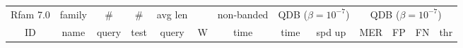 %
%
%
%

\renewcommand{\baselinestretch}{1.0}
\begin{table}
\scriptsize
\begin{center}
\begin{tabular}{|ll|rr|rr|r|rr|rrrr|} \hline
\multicolumn{1}{|c}{Rfam 7.0} & \multicolumn{1}{c|}{family} &
\multicolumn{1}{c}{\#} & \multicolumn{1}{c|}{\#} &
\multicolumn{1}{c}{avg len} & \multicolumn{1}{c|}{} &
\multicolumn{1}{c}{non-banded} & \multicolumn{2}{|c|}{QDB
    ($\beta=10^{-7}$)} &  \multicolumn{4}{|c|}{QDB ($\beta=10^{-7}$)} \\ 
\multicolumn{1}{|c}{ID} & \multicolumn{1}{c|}{name} &
\multicolumn{1}{c}{query} & \multicolumn{1}{c|}{test} &
\multicolumn{1}{c}{query} & \multicolumn{1}{c|}{W} &
\multicolumn{1}{|c|}{time} & \multicolumn{1}{|c}{time} &
    \multicolumn{1}{c|}{spd up} & \multicolumn{1}{c}{MER} &
      \multicolumn{1}{c}{FP} & \multicolumn{1}{c}{FN} &
      \multicolumn{1}{c|}{thr} \\ \hline 


\end{tabular}
\end{center}
\end{table}

